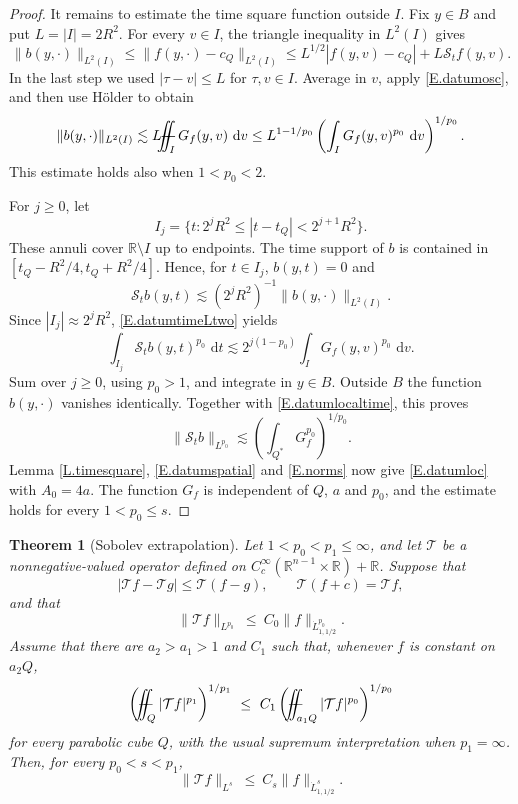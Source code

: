\documentclass[12pt,leqno]{amsart}
\numberwithin{equation}{section}
\newcommand{\R}{\mathbb R}
\renewcommand{\d}{\,\mathrm d}
\def\Yint#1{\mathchoice
	{\YYint\displaystyle\textstyle{#1}}%
	{\YYint\textstyle\scriptstyle{#1}}%
	{\YYint\scriptstyle\scriptscriptstyle{#1}}%
	{\YYint\scriptscriptstyle\scriptscriptstyle{#1}}%
	\!\dint}
\newcommand{\dint}{\int\!\!\!\!\!\int}
\def\YYint#1#2#3{{\setbox0=\hbox{$#1{#2#3}{\iint}$}
		\vcenter{\hbox{$#2#3$}}\kern-.51\wd0}}
\def\longdash{\mkern-1.5mu{-}\mkern-7.5mu{-}}
\def\fiint{\Yint\longdash}
\theoremstyle{plain}
\newtheorem{theorem}[equation]{Theorem}
\theoremstyle{remark}
\begin{document}
\begin{proof}
It remains to estimate the time square function outside $I$. Fix $y\in B$
and put $L=|I|=2R^2$. For every $v\in I$, the triangle inequality in
$L^2(I)$ gives
\[
 \|b(y,\cdot)\|_{L^2(I)}
 \le \|f(y,\cdot)-c_Q\|_{L^2(I)}
 \le L^{1/2}|f(y,v)-c_Q|+L\mathcal S_t f(y,v).
\]
In the last step we used $|\tau-v|\le L$ for $\tau,v\in I$.
Average in $v$, apply \eqref{E.datumosc}, and then use H\"older to obtain
\begin{equation}\label{E.datumtimeLtwo}
 \|b(y,\cdot)\|_{L^2(I)}
 \lesssim L\fiint_I G_f(y,v)\,\d v
 \le L^{1-1/p_0}
       \left(\int_I G_f(y,v)^{p_0}\,\d v\right)^{1/p_0}.
\end{equation}
This estimate holds also when $1<p_0<2$.

For $j\ge0$, let
\[
 I_j=\{t:2^jR^2\le|t-t_Q|<2^{j+1}R^2\}.
\]
These annuli cover $\R\setminus I$ up to endpoints. The time support of
$b$ is contained in $[t_Q-R^2/4,t_Q+R^2/4]$. Hence, for $t\in I_j$,
$b(y,t)=0$ and
\[
 \mathcal S_t b(y,t)
 \lesssim (2^jR^2)^{-1}\|b(y,\cdot)\|_{L^2(I)}.
\]
Since $|I_j|\approx2^jR^2$, \eqref{E.datumtimeLtwo} yields
\[
 \int_{I_j}\mathcal S_t b(y,t)^{p_0}\,\d t
 \lesssim 2^{j(1-p_0)}\int_I G_f(y,v)^{p_0}\,\d v.
\]
Sum over $j\ge0$, using $p_0>1$, and integrate in $y\in B$.
Outside $B$ the function $b(y,\cdot)$ vanishes identically.
Together with \eqref{E.datumlocaltime}, this proves
\[
 \|\mathcal S_t b\|_{L^{p_0}}
 \lesssim\left(\int_{Q^*}G_f^{p_0}\right)^{1/p_0}.
\]
Lemma \ref{L.timesquare}, \eqref{E.datumspatial} and \eqref{E.norms}
now give \eqref{E.datumloc} with $A_0=4a$. The function $G_f$ is
independent of $Q$, $a$ and $p_0$, and the estimate holds for every
$1<p_0\le s$.
\end{proof}

\begin{theorem}[Sobolev extrapolation]\label{T.SobolevShen}
Let $1<p_0<p_1\le\infty$, and let $\mathcal T$ be a nonnegative-valued
operator defined on $C_c^\infty(\R^{n-1}\times\R)+\R$. Suppose
that
\begin{equation}\label{E.Tsublinear}
 |\mathcal Tf-\mathcal Tg|\le\mathcal T(f-g),\qquad
 \mathcal T(f+c)=\mathcal Tf,
\end{equation}
and that
\begin{equation}\label{E.Tpzero}
 \|\mathcal Tf\|_{L^{p_0}}
 \ \le\ C_0\|f\|_{\dot L^{p_0}_{1,1/2}}.
\end{equation}
Assume that there are $a_2>a_1>1$ and $C_1$ such that, whenever $f$ is
constant on $a_2Q$,
\begin{equation}\label{E.Toffdiag}
 \left(\fiint_Q|\mathcal Tf|^{p_1}\right)^{1/p_1}
 \ \le\ C_1
 \left(\fiint_{a_1Q}|\mathcal Tf|^{p_0}\right)^{1/p_0}
\end{equation}
for every parabolic cube $Q$, with the usual supremum interpretation when
$p_1=\infty$. Then, for every $p_0<s<p_1$,
\begin{equation}\label{E.Ts}
 \|\mathcal Tf\|_{L^s}
 \ \le\ C_s\|f\|_{\dot L^s_{1,1/2}}.
\end{equation}
\end{theorem}
\end{document}
